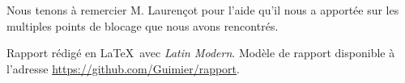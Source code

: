 Nous tenons à remercier M. Laurençot pour l’aide qu’il nous a apportée sur les multiples points de blocage que nous avons rencontrés.

\vfill

\begin{center}
Rapport rédigé en \LaTeX\ avec \emph{Latin Modern}. \newline
Modèle de rapport disponible à l’adresse \url{https://github.com/Guimier/rapport}.
\end{center}
